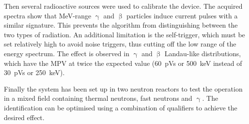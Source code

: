 Then several radioactive sources were used to calibrate the device. 
The acquired spectra show that MeV-range $\upgamma$ and $\upbeta$ particles induce current pulses with a similar signature. This prevents the algorithm from distinguishing between the two types of radiation. An additional limitation is the self-trigger, which must be set relatively high to avoid noise triggers, thus cutting off the low range of the energy spectrum. The effect is observed in $\upgamma$ and $\upbeta$ Landau-like distributions, which have the MPV at twice the expected value (60~pVs or 500~keV instead of 30~pVs or 250~keV). 

Finally the system has been set up in two neutron reactors to test the operation in a mixed field containing thermal neutrons, fast neutrons and $\upgamma$. The identification can be optimised using a combination of qualifiers to achieve the desired effect.